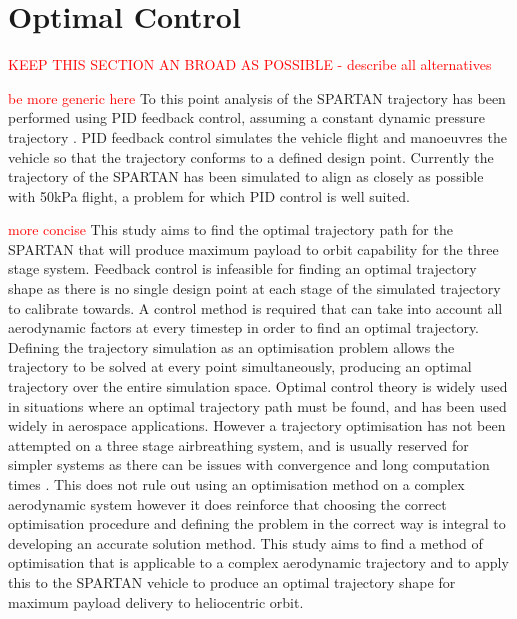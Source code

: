 \section{Optimal Control}

\textcolor{red}{KEEP THIS SECTION AN BROAD AS POSSIBLE - describe all alternatives}

\textcolor{red}{be more generic here}
To this point analysis of the SPARTAN trajectory has been performed using PID feedback control, assuming a constant dynamic pressure trajectory \cite{Preller2015}. PID feedback control simulates the vehicle flight and manoeuvres the vehicle so that the trajectory conforms to a defined design point. Currently the trajectory of the SPARTAN has been simulated to align as closely as possible with 50kPa flight, a problem for which PID control is well suited. 

\textcolor{red}{more concise}
This study aims to find the optimal trajectory path for the SPARTAN that will produce maximum payload to orbit capability for the three stage system. Feedback control is infeasible for finding an optimal trajectory shape as there is no single design point at each stage of the simulated trajectory to calibrate towards. A control method is required that can take into account all aerodynamic factors at every timestep in order to find an optimal trajectory. Defining the trajectory simulation as an optimisation problem allows the trajectory to be solved at every point simultaneously, producing an optimal trajectory over the entire simulation space. Optimal control theory is widely used in situations where an optimal trajectory path must be found, and has been used widely in aerospace applications. However a trajectory optimisation has not been attempted on a three stage airbreathing system, and is usually reserved for simpler systems as there can be issues with convergence and long computation times \cite{Diehl2006}. This does not rule out using an optimisation method on a complex aerodynamic system however it does reinforce that choosing the correct optimisation procedure and defining the problem in the correct way is integral to developing an accurate solution method. This study aims to find a method of optimisation that is applicable to a complex aerodynamic trajectory and to apply this to the SPARTAN vehicle to produce an optimal trajectory shape for maximum payload delivery to heliocentric orbit.

